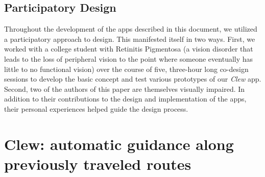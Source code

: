 \documentclass[chi_draft]{sigchi}
\begin{document}
\subsection{Participatory Design}

Throughout the development of the apps described in this document, we utilized a participatory approach to design.  This manifested itself in two ways.  First, we worked with a college student with Retinitis Pigmentosa (a vision disorder that leads to the loss of peripheral vision to the point where someone eventually has little to no functional vision) over the course of five, three-hour long co-design sessions to develop the basic concept and test various prototypes of our \emph{Clew} app.   Second, two of the authors of this paper are themselves visually impaired.  In addition to their contributions to the design and implementation of the apps, their personal experiences helped guide the design process.

\section{Clew: automatic guidance along previously traveled routes}
\end{document}
